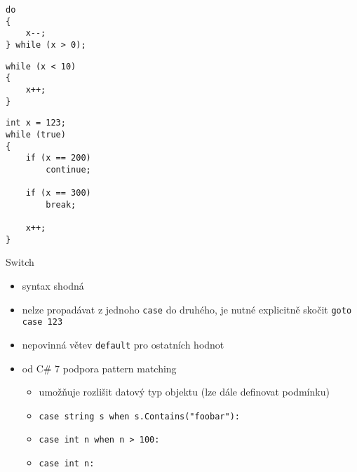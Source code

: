 \begin{frame}[fragile]
\vfill
\begin{yesblock}
\begin{lstlisting}
do
{
    x--;
} while (x > 0);
\end{lstlisting}
\end{yesblock}
\vfill
\begin{yesblock}
\begin{lstlisting}
while (x < 10)
{
    x++;
}
\end{lstlisting}
\end{yesblock}
\vfill
\end{frame}




\begin{frame}[fragile]
\begin{yesblock}
\begin{lstlisting}
int x = 123;
while (true)
{
    if (x == 200)
        continue;

    if (x == 300)
        break;
    
    x++;
}
\end{lstlisting}
\end{yesblock}
\end{frame}





\begin{frame}[fragile]
\vfill
\begin{block}{Switch}
\begin{itemize}
\item syntax shodná
\item nelze propadávat z jednoho \lstinline|case| do druhého, je nutné explicitně skočit \lstinline|goto case 123|
\item nepovinná větev \lstinline|default| pro ostatních hodnot
\end{itemize}
\end{block}
\vfill
\begin{bonusblock}{}
\begin{itemize}
\item od C\# 7 podpora pattern matching
\begin{itemize}
\item umožňuje rozlišit datový typ objektu (lze dále definovat podmínku)
\item \lstinline|case string s when s.Contains("foobar"):|
\item \lstinline|case int n when n > 100:|
\item \lstinline|case int n:|
\end{itemize}
\end{itemize}
\end{bonusblock}
\vfill
\end{frame}





